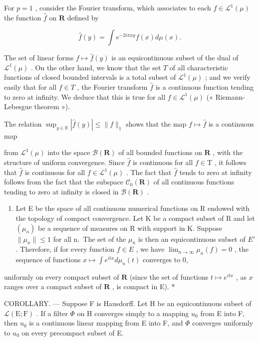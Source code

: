 For \(p = 1\) , consider the Fourier transform, which associates to each \(f \in \mathcal{L}^1(\mu)\) the function \(\hat{f}\) on \(\mathbf{R}\) defined by

\[
\hat {f} (y) = \int e ^ {- 2 i \pi x y} f (x) d \mu (x).
\]

The set of linear forms \(f \mapsto \hat{f}(y)\) is an equicontinuous subset of the dual of \(\mathcal{L}^1(\mu)\) . On the other hand, we know that the set \(T\) of all characteristic functions of closed bounded intervals is a total subset of \(\mathcal{L}^1(\mu)\) ; and we verify easily that for all \(f \in T\) , the Fourier transform \(\hat{f}\) is a continuous function tending to zero at infinity. We deduce that this is true for all \(f \in \mathcal{L}^1(\mu)\) (« Riemann-Lebesgue theorem »).

The relation \(\sup_{y\in \mathbb{R}}|\hat{f} (y)|\leqslant \| f\| _1\) shows that the map \(f\mapsto \hat{f}\) is a continuous map

from \(\mathcal{L}^1 (\mu)\) into the space \(\mathcal{B}(\mathbf{R})\) of all bounded functions on \(\mathbf{R}\) , with the structure of uniform convergence. Since \(\hat{f}\) is continuous for all \(f\in \mathrm{T}\) , it follows that \(\hat{f}\) is continuous for all \(f\in \mathcal{L}^1 (\mu)\) . The fact that \(\hat{f}\) tends to zero at infinity follows from the fact that the subspace \(\mathcal{C}_0(\mathbf{R})\) of all continuous functions tending to zero at infinity is closed in \(\mathcal{B}(\mathbf{R})\) .

\begin{enumerate}
\def\labelenumi{\arabic{enumi})}
\setcounter{enumi}{1}
\tightlist
\item
  Let E be the space of all continuous numerical functions on R endowed with the topology of compact convergence. Let K be a compact subset of R and let \((\mu_{n})\) be a sequence of measures on R with support in K. Suppose \(\|\mu_{n}\|\leqslant1\) for all n.~The set of the \(\mu_{n}\) is then an equicontinuous subset of \(E'\) . Therefore, if for every function \(f\in E\) , we have \(\lim_{n\to\infty}\mu_{n}(f)=0\) , the sequence of functions \(x\mapsto\int e^{itx}d\mu_{n}(t)\) converges to 0,
\end{enumerate}

uniformly on every compact subset of \(\mathbf{R}\) (since the set of functions \(t \mapsto e^{itx}\) , as \(x\) ranges over a compact subset of \(\mathbf{R}\) , is compact in E). *

COROLLARY. --- Suppose F is Hausdorff. Let H be an equicontinuous subset of \(\mathcal{L}(\mathrm{E};\mathrm{F})\) . If a filter \(\Phi\) on H converges simply to a mapping \(u_{0}\) from E into F, then \(u_{0}\) is a continuous linear mapping from E into F, and \(\Phi\) converges uniformly to \(u_{0}\) on every precompact subset of E.

